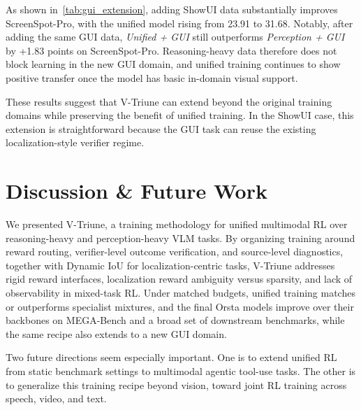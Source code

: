 As shown in~\cref{tab:gui_extension}, adding ShowUI data substantially improves ScreenSpot-Pro, with the unified model rising from 23.91 to 31.68.
%
Notably, after adding the same GUI data, \textit{Unified + GUI} still outperforms \textit{Perception + GUI} by +1.83 points on ScreenSpot-Pro.
%
Reasoning-heavy data therefore does not block learning in the new GUI domain, and unified training continues to show positive transfer once the model has basic in-domain visual support.

These results suggest that V-Triune can extend beyond the original training domains while preserving the benefit of unified training.
%
In the ShowUI case, this extension is straightforward because the GUI task can reuse the existing localization-style verifier regime.


\section{Discussion \& Future Work}

We presented V-Triune, a training methodology for unified multimodal RL over reasoning-heavy and perception-heavy VLM tasks.
%
By organizing training around reward routing, verifier-level outcome verification, and source-level diagnostics, together with Dynamic IoU for localization-centric tasks, V-Triune addresses rigid reward interfaces, localization reward ambiguity versus sparsity, and lack of observability in mixed-task RL.
%
Under matched budgets, unified training matches or outperforms specialist mixtures, and the final Orsta models improve over their backbones on MEGA-Bench and a broad set of downstream benchmarks, while the same recipe also extends to a new GUI domain.

Two future directions seem especially important.
%
One is to extend unified RL from static benchmark settings to multimodal agentic tool-use tasks.
%
The other is to generalize this training recipe beyond vision, toward joint RL training across speech, video, and text.






